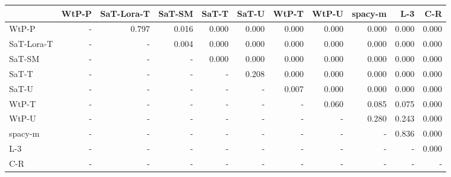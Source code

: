 \begin{tabular}{lrrrrrrrrrr}
\toprule
 & WtP-P & SaT-Lora-T & SaT-SM & SaT-T & SaT-U & WtP-T & WtP-U & spacy-m & L-3 & C-R \\
\midrule
WtP-P & - & 0.797 & 0.016 & 0.000 & 0.000 & 0.000 & 0.000 & 0.000 & 0.000 & 0.000 \\
SaT-Lora-T & - & - & 0.004 & 0.000 & 0.000 & 0.000 & 0.000 & 0.000 & 0.000 & 0.000 \\
SaT-SM & - & - & - & 0.000 & 0.000 & 0.000 & 0.000 & 0.000 & 0.000 & 0.000 \\
SaT-T & - & - & - & - & 0.208 & 0.000 & 0.000 & 0.000 & 0.000 & 0.000 \\
SaT-U & - & - & - & - & - & 0.007 & 0.000 & 0.000 & 0.000 & 0.000 \\
WtP-T & - & - & - & - & - & - & 0.060 & 0.085 & 0.075 & 0.000 \\
WtP-U & - & - & - & - & - & - & - & 0.280 & 0.243 & 0.000 \\
spacy-m & - & - & - & - & - & - & - & - & 0.836 & 0.000 \\
L-3 & - & - & - & - & - & - & - & - & - & 0.000 \\
C-R & - & - & - & - & - & - & - & - & - & - \\
\bottomrule
\end{tabular}

